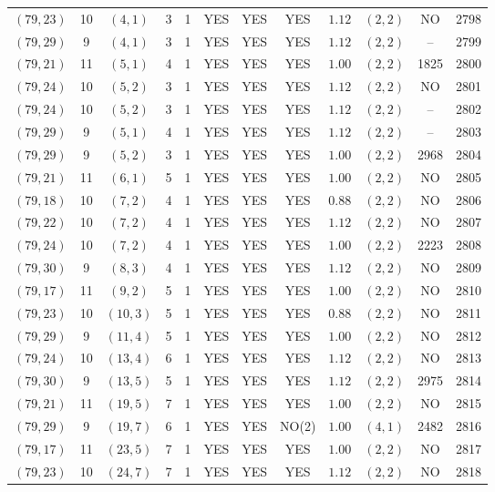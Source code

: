 \begin{longtable}{|c|c|c|c|c|c|c|c|c|c|c|c|}
$(79,23)$ & 10 & $(4,1)$ & 3 & 1 & YES & YES & YES & $1.12$ & $(2,2)$ & NO & 2798\\
$(79,29)$ & 9 & $(4,1)$ & 3 & 1 & YES & YES & YES & $1.12$ & $(2,2)$ & -- & 2799\\
$(79,21)$ & 11 & $(5,1)$ & 4 & 1 & YES & YES & YES & $1.00$ & $(2,2)$ & 1825 & 2800\\
$(79,24)$ & 10 & $(5,2)$ & 3 & 1 & YES & YES & YES & $1.12$ & $(2,2)$ & NO & 2801\\
$(79,24)$ & 10 & $(5,2)$ & 3 & 1 & YES & YES & YES & $1.12$ & $(2,2)$ & -- & 2802\\
$(79,29)$ & 9 & $(5,1)$ & 4 & 1 & YES & YES & YES & $1.12$ & $(2,2)$ & -- & 2803\\
$(79,29)$ & 9 & $(5,2)$ & 3 & 1 & YES & YES & YES & $1.00$ & $(2,2)$ & 2968 & 2804\\
$(79,21)$ & 11 & $(6,1)$ & 5 & 1 & YES & YES & YES & $1.00$ & $(2,2)$ & NO & 2805\\
$(79,18)$ & 10 & $(7,2)$ & 4 & 1 & YES & YES & YES & $0.88$ & $(2,2)$ & NO & 2806\\
$(79,22)$ & 10 & $(7,2)$ & 4 & 1 & YES & YES & YES & $1.12$ & $(2,2)$ & NO & 2807\\
$(79,24)$ & 10 & $(7,2)$ & 4 & 1 & YES & YES & YES & $1.00$ & $(2,2)$ & 2223 & 2808\\
$(79,30)$ & 9 & $(8,3)$ & 4 & 1 & YES & YES & YES & $1.12$ & $(2,2)$ & NO & 2809\\
$(79,17)$ & 11 & $(9,2)$ & 5 & 1 & YES & YES & YES & $1.00$ & $(2,2)$ & NO & 2810\\
$(79,23)$ & 10 & $(10,3)$ & 5 & 1 & YES & YES & YES & $0.88$ & $(2,2)$ & NO & 2811\\
$(79,29)$ & 9 & $(11,4)$ & 5 & 1 & YES & YES & YES & $1.00$ & $(2,2)$ & NO & 2812\\
$(79,24)$ & 10 & $(13,4)$ & 6 & 1 & YES & YES & YES & $1.12$ & $(2,2)$ & NO & 2813\\
$(79,30)$ & 9 & $(13,5)$ & 5 & 1 & YES & YES & YES & $1.12$ & $(2,2)$ & 2975 & 2814\\
$(79,21)$ & 11 & $(19,5)$ & 7 & 1 & YES & YES & YES & $1.00$ & $(2,2)$ & NO & 2815\\
$(79,29)$ & 9 & $(19,7)$ & 6 & 1 & YES & YES & NO(2) & $1.00$ & $(4,1)$ & 2482 & 2816\\
$(79,17)$ & 11 & $(23,5)$ & 7 & 1 & YES & YES & YES & $1.00$ & $(2,2)$ & NO & 2817\\
$(79,23)$ & 10 & $(24,7)$ & 7 & 1 & YES & YES & YES & $1.12$ & $(2,2)$ & NO & 2818\\

\end{longtable}
